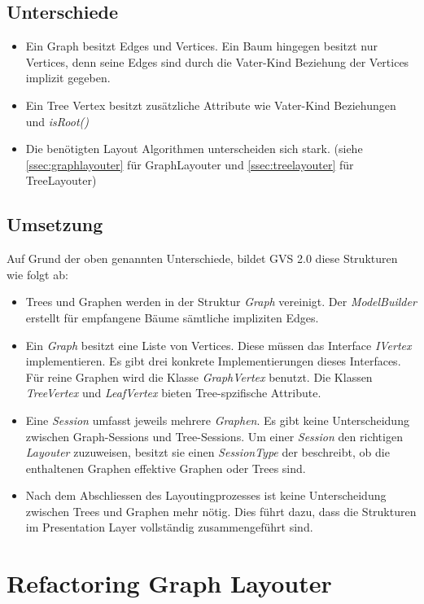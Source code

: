 \documentclass[11pt,a4paper,english,oneside]{book}
\numberwithin{equation}{chapter}
\begin{document}
	\subsection{Unterschiede}
	\begin{itemize}
		\item Ein Graph besitzt Edges und Vertices. Ein Baum hingegen besitzt nur Vertices, denn seine Edges sind durch die Vater-Kind Beziehung der Vertices implizit gegeben. 
		\item Ein Tree Vertex besitzt zusätzliche Attribute wie Vater-Kind Beziehungen und \textit{isRoot()}
		\item Die benötigten Layout Algorithmen unterscheiden sich stark. (siehe \ref{ssec:graphlayouter} für GraphLayouter und \ref{ssec:treelayouter} für TreeLayouter)
	\end{itemize}
	
	\subsection{Umsetzung}
	Auf Grund der oben genannten Unterschiede, bildet GVS 2.0 diese Strukturen wie folgt ab:
	
	\begin{itemize}
		\item Trees und Graphen werden in der Struktur \textit{Graph} vereinigt. Der \textit{ModelBuilder} erstellt für empfangene Bäume sämtliche impliziten Edges.
		\item Ein \textit{Graph} besitzt eine Liste von Vertices. Diese müssen das Interface \textit{IVertex} implementieren. Es gibt drei konkrete Implementierungen dieses Interfaces. Für reine Graphen wird die Klasse \textit{GraphVertex} benutzt. Die Klassen \textit{TreeVertex} und \textit{LeafVertex} bieten Tree-spzifische Attribute.
		\item Eine \textit{Session} umfasst jeweils mehrere \textit{Graphen}. Es gibt keine Unterscheidung zwischen Graph-Sessions und Tree-Sessions. Um einer \textit{Session} den richtigen \textit{Layouter} zuzuweisen, besitzt sie einen \textit{SessionType} der beschreibt, ob die enthaltenen Graphen effektive Graphen oder Trees sind.
		\item Nach dem Abschliessen des Layoutingprozesses ist keine Unterscheidung zwischen Trees und Graphen mehr nötig. Dies führt dazu, dass die Strukturen im Presentation Layer vollständig zusammengeführt sind.
	\end{itemize}
	
	\section{Refactoring Graph Layouter}
	
\end{document}
